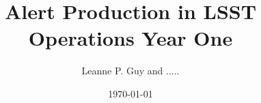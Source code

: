 \documentclass[DM,lsstdraft]{lsstdoc}
\title{Alert Production in LSST Operations Year One}
\author{%
Leanne P. Guy and  .....
}
\date{\today}
\begin{document}
\maketitle




\appendix
\label{sec:bib}


%
\label{sec:acronyms}
\newpage
\printglossaries
\end{document}
